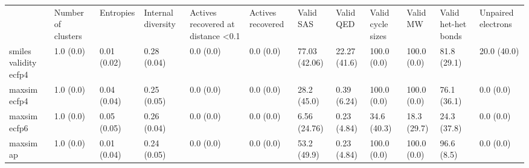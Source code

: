 \begin{tabular}{llllllllllll}
 & Number of clusters & Entropies & Internal diversity & Actives recovered at distance <0.1 & Actives recovered & Valid SAS & Valid QED & Valid cycle sizes & Valid MW & Valid het-het bonds & Unpaired electrons \\
smiles validity ecfp4 & {\cellcolor[HTML]{F6FCFD}} \color[HTML]{000000} 1.0 (0.0) & {\cellcolor[HTML]{F7FCFD}} \color[HTML]{000000} 0.01 (0.02) & {\cellcolor[HTML]{5BBC96}} \color[HTML]{F1F1F1} 0.28 (0.04) & {\cellcolor[HTML]{F7FCFD}} \color[HTML]{000000} 0.0 (0.0) & {\cellcolor[HTML]{F7FCFD}} \color[HTML]{000000} 0.0 (0.0) & {\cellcolor[HTML]{1D8640}} \color[HTML]{F1F1F1} 77.03 (42.06) & {\cellcolor[HTML]{D1EEEA}} \color[HTML]{000000} 22.27 (41.6) & {\cellcolor[HTML]{1A843F}} \color[HTML]{F1F1F1} 100.0 (0.0) & {\cellcolor[HTML]{F7FCFD}} \color[HTML]{000000} 100.0 (0.0) & {\cellcolor[HTML]{F7FCFD}} \color[HTML]{000000} 81.8 (29.1) & {\cellcolor[HTML]{F7FCFD}} \color[HTML]{000000} 20.0 (40.0) \\
maxsim ecfp4 & {\cellcolor[HTML]{F6FCFD}} \color[HTML]{000000} 1.0 (0.0) & {\cellcolor[HTML]{F7FCFD}} \color[HTML]{000000} 0.04 (0.04) & {\cellcolor[HTML]{5DBD99}} \color[HTML]{000000} 0.25 (0.05) & {\cellcolor[HTML]{F7FCFD}} \color[HTML]{000000} 0.0 (0.0) & {\cellcolor[HTML]{F7FCFD}} \color[HTML]{000000} 0.0 (0.0) & {\cellcolor[HTML]{BFE7DE}} \color[HTML]{000000} 28.2 (45.0) & {\cellcolor[HTML]{F6FCFD}} \color[HTML]{000000} 0.39 (6.24) & {\cellcolor[HTML]{006428}} \color[HTML]{F1F1F1} 100.0 (0.0) & {\cellcolor[HTML]{F7FCFD}} \color[HTML]{000000} 100.0 (0.0) & {\cellcolor[HTML]{F7FCFD}} \color[HTML]{000000} 76.1 (36.1) & {\cellcolor[HTML]{F7FCFD}} \color[HTML]{000000} 0.0 (0.0) \\
maxsim ecfp6 & {\cellcolor[HTML]{F6FCFD}} \color[HTML]{000000} 1.0 (0.0) & {\cellcolor[HTML]{F7FCFD}} \color[HTML]{000000} 0.05 (0.05) & {\cellcolor[HTML]{67C2A5}} \color[HTML]{000000} 0.26 (0.04) & {\cellcolor[HTML]{F7FCFD}} \color[HTML]{000000} 0.0 (0.0) & {\cellcolor[HTML]{F7FCFD}} \color[HTML]{000000} 0.0 (0.0) & {\cellcolor[HTML]{EEF8FB}} \color[HTML]{000000} 6.56 (24.76) & {\cellcolor[HTML]{F7FCFD}} \color[HTML]{000000} 0.23 (4.84) & {\cellcolor[HTML]{00441B}} \color[HTML]{F1F1F1} 34.6 (40.3) & {\cellcolor[HTML]{F7FCFD}} \color[HTML]{000000} 18.3 (29.7) & {\cellcolor[HTML]{F7FCFD}} \color[HTML]{000000} 24.3 (37.8) & {\cellcolor[HTML]{F7FCFD}} \color[HTML]{000000} 0.0 (0.0) \\
maxsim ap & {\cellcolor[HTML]{F6FCFD}} \color[HTML]{000000} 1.0 (0.0) & {\cellcolor[HTML]{F7FCFD}} \color[HTML]{000000} 0.01 (0.04) & {\cellcolor[HTML]{6FC6AA}} \color[HTML]{000000} 0.24 (0.05) & {\cellcolor[HTML]{F7FCFD}} \color[HTML]{000000} 0.0 (0.0) & {\cellcolor[HTML]{F7FCFD}} \color[HTML]{000000} 0.0 (0.0) & {\cellcolor[HTML]{5CBD98}} \color[HTML]{F1F1F1} 53.2 (49.9) & {\cellcolor[HTML]{F7FCFD}} \color[HTML]{000000} 0.23 (4.84) & {\cellcolor[HTML]{006428}} \color[HTML]{F1F1F1} 100.0 (0.0) & {\cellcolor[HTML]{F7FCFD}} \color[HTML]{000000} 100.0 (0.0) & {\cellcolor[HTML]{F7FCFD}} \color[HTML]{000000} 96.6 (8.5) & {\cellcolor[HTML]{F7FCFD}} \color[HTML]{000000} 0.0 (0.0) \\

\end{tabular}
